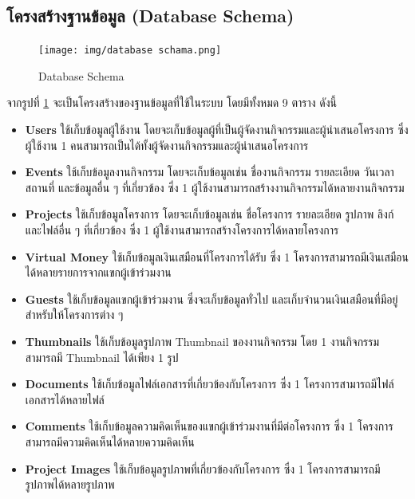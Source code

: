 \newpage
\subsection{โครงสร้างฐานข้อมูล (Database Schema)}
\begin{center}
    \begin{figure}[h]
        \centering
        \texttt{[image: img/database schama.png]}
        \caption{Database Schema}
        \label{fig:data_schema}
    \end{figure}
\end{center}
จากรูปที่ \ref{fig:data_schema} จะเป็นโครงสร้างของฐานข้อมูลที่ใช้ในระบบ โดยมีทั้งหมด 9  ตาราง ดังนี้
\begin{itemize}
    \item \textbf{Users} ใช้เก็บข้อมูลผู้ใช้งาน โดยจะเก็บข้อมูลผู้ที่เป็นผู้จัดงานกิจกรรมและผู้นำเสนอโครงการ ซึ่งผู้ใช้งาน 1 คนสามารถเป็นได้ทั้งผู้จัดงานกิจกรรมและผู้นำเสนอโครงการ
    \item \textbf{Events} ใช้เก็บข้อมูลงานกิจกรรม โดยจะเก็บข้อมูลเช่น ชื่องานกิจกรรม รายละเอียด วันเวลา สถานที่ และข้อมูลอื่น ๆ ที่เกี่ยวข้อง ซึ่ง 1 ผู้ใช้งานสามารถสร้างงานกิจกรรมได้หลายงานกิจกรรม
    \item \textbf{Projects} ใช้เก็บข้อมูลโครงการ โดยจะเก็บข้อมูลเช่น ชื่อโครงการ รายละเอียด รูปภาพ ลิงก์ และไฟล์อื่น ๆ ที่เกี่ยวข้อง ซึ่ง 1 ผู้ใช้งานสามารถสร้างโครงการได้หลายโครงการ
    \item \textbf{Virtual Money} ใช้เก็บข้อมูลเงินเสมือนที่โครงการได้รับ ซึ่ง 1 โครงการสามารถมีเงินเสมือนได้หลายรายการจากแขกผู้เข้าร่วมงาน
    \item \textbf{Guests} ใช้เก็บข้อมูลแขกผู้เข้าร่วมงาน ซึ่งจะเก็บข้อมูลทั่วไป และเก็บจำนวนเงินเสมือนที่มีอยู่ สำหรับให้โครงการต่าง ๆ
    \item \textbf{Thumbnails} ใช้เก็บข้อมูลรูปภาพ Thumbnail ของงานกิจกรรม โดย 1 งานกิจกรรมสามารถมี Thumbnail ได้เพียง 1 รูป
    \item \textbf{Documents} ใช้เก็บข้อมูลไฟล์เอกสารที่เกี่ยวข้องกับโครงการ ซึ่ง 1 โครงการสามารถมีไฟล์เอกสารได้หลายไฟล์
    \item \textbf{Comments} ใช้เก็บข้อมูลความคิดเห็นของแขกผู้เข้าร่วมงานที่มีต่อโครงการ ซึ่ง 1 โครงการสามารถมีความคิดเห็นได้หลายความคิดเห็น
    \item \textbf{Project Images} ใช้เก็บข้อมูลรูปภาพที่เกี่ยวข้องกับโครงการ ซึ่ง 1 โครงการสามารถมีรูปภาพได้หลายรูปภาพ
\end{itemize}

